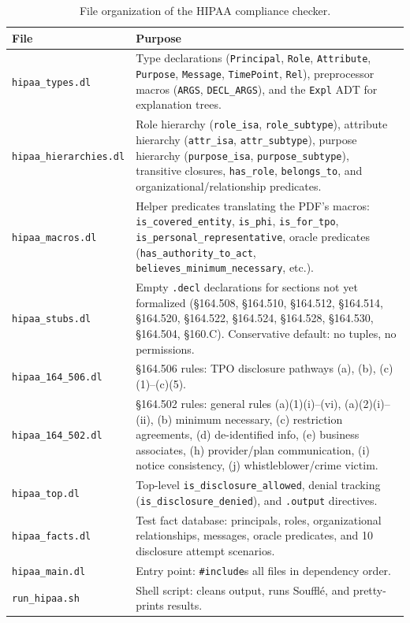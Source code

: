 \documentclass[11pt,letterpaper]{article}
\begin{document}
\begin{table}[H]
\centering
\begin{tabularx}{\textwidth}{lX}
\toprule
\textbf{File} & \textbf{Purpose} \\
\midrule
\texttt{hipaa\_types.dl}        & Type declarations (\texttt{Principal}, \texttt{Role}, \texttt{Attribute}, \texttt{Purpose}, \texttt{Message}, \texttt{TimePoint}, \texttt{Rel}), preprocessor macros (\texttt{ARGS}, \texttt{DECL\_ARGS}), and the \texttt{Expl} ADT for explanation trees. \\
\texttt{hipaa\_hierarchies.dl}  & Role hierarchy (\texttt{role\_isa}, \texttt{role\_subtype}), attribute hierarchy (\texttt{attr\_isa}, \texttt{attr\_subtype}), purpose hierarchy (\texttt{purpose\_isa}, \texttt{purpose\_subtype}), transitive closures, \texttt{has\_role}, \texttt{belongs\_to}, and organizational/relationship predicates. \\
\texttt{hipaa\_macros.dl}       & Helper predicates translating the PDF's macros: \texttt{is\_covered\_entity}, \texttt{is\_phi}, \texttt{is\_for\_tpo}, \texttt{is\_personal\_representative}, oracle predicates (\texttt{has\_authority\_to\_act}, \texttt{believes\_minimum\_necessary}, etc.). \\
\texttt{hipaa\_stubs.dl}        & Empty \texttt{.decl} declarations for sections not yet formalized (\S 164.508, \S 164.510, \S 164.512, \S 164.514, \S 164.520, \S 164.522, \S 164.524, \S 164.528, \S 164.530, \S 164.504, \S 160.C). Conservative default: no tuples, no permissions. \\
\texttt{hipaa\_164\_506.dl}     & \S 164.506 rules: TPO disclosure pathways (a), (b), (c)(1)--(c)(5). \\
\texttt{hipaa\_164\_502.dl}     & \S 164.502 rules: general rules (a)(1)(i)--(vi), (a)(2)(i)--(ii), (b) minimum necessary, (c) restriction agreements, (d) de-identified info, (e) business associates, (h) provider/plan communication, (i) notice consistency, (j) whistleblower/crime victim. \\
\texttt{hipaa\_top.dl}          & Top-level \texttt{is\_disclosure\_allowed}, denial tracking (\texttt{is\_disclosure\_denied}), and \texttt{.output} directives. \\
\texttt{hipaa\_facts.dl}        & Test fact database: principals, roles, organizational relationships, messages, oracle predicates, and 10 disclosure attempt scenarios. \\
\texttt{hipaa\_main.dl}         & Entry point: \texttt{\#include}s all files in dependency order. \\
\texttt{run\_hipaa.sh}          & Shell script: cleans output, runs Souffl\'{e}, and pretty-prints results. \\
\bottomrule
\end{tabularx}
\caption{File organization of the HIPAA compliance checker.}
\label{tab:files}
\end{table}
\end{document}
